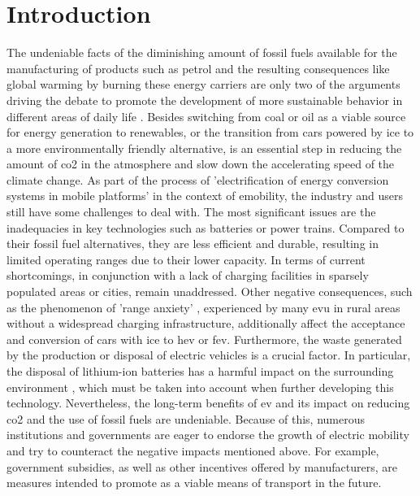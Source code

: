 
\chapter{Introduction}
\label{ch:Introduction}

The undeniable facts of the diminishing amount of fossil fuels available for the manufacturing of products such as petrol and the resulting consequences like global warming by burning these energy carriers are only two of the arguments driving the debate to promote the development of more sustainable behavior in different areas of daily life \cite{kathiresh_e-mobility_2022}.
Besides switching from coal or oil as a viable source for energy generation to renewables, or the transition from cars powered by \acrfull{ice} to a more environmentally friendly alternative, is an essential step in reducing the amount of \acrfull{co2} in the atmosphere and slow down the accelerating speed of the climate change.
As part of the process of 'electrification of energy conversion systems in mobile platforms' \cite[165226]{adib_e-mobility_2019} in the context of \acrfull{emobility}, the industry and users still have some challenges to deal with.
The most significant issues are the inadequacies in key technologies such as batteries or power trains. Compared to their fossil fuel alternatives, they are less efficient and durable, resulting in limited operating ranges due to their lower capacity. 
In terms of current shortcomings, in conjunction with a lack of charging facilities in sparsely populated areas or cities, remain unaddressed.
Other negative consequences, such as the phenomenon of 'range anxiety' \cite{rauh_understanding_2015}, experienced by many \acrfull{evu} in rural areas without a widespread charging infrastructure, additionally affect the acceptance and conversion of cars with \acrshort{ice} to \acrfull{hev} or \acrfull{fev}. 
Furthermore, the waste generated by the production or disposal of electric vehicles is a crucial factor. In particular, the disposal of lithium-ion batteries has a harmful impact on the surrounding environment \cite{xu_generation_2017}, which must be taken into account when further developing this technology.
Nevertheless, the long-term benefits of \acrshort{ev} and its impact on reducing \acrshort{co2} and the use of fossil fuels are undeniable.
Because of this, numerous institutions and governments are eager to endorse the growth of electric mobility and try to counteract the negative impacts mentioned above.
For example, government subsidies, as well as other incentives offered by manufacturers, are measures intended to promote  as a viable means of transport in the future.

